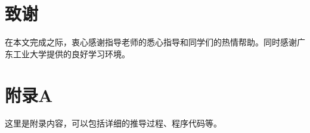 \documentclass[12pt,a4paper]{article}
\numberwithin{equation}{section}
\begin{document}
{}

\nocite{*}


\section*{致谢}

在本文完成之际，衷心感谢指导老师的悉心指导和同学们的热情帮助。同时感谢广东工业大学提供的良好学习环境。

\appendix
\section{附录A}
\label{app:A}

这里是附录内容，可以包括详细的推导过程、程序代码等。
\end{document}
